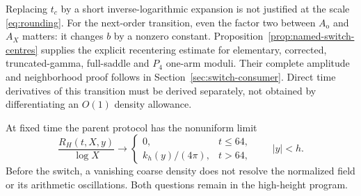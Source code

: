 \documentclass[11pt]{article}
\numberwithin{equation}{section}
\begin{document}
Replacing \(t_c\) by a short inverse-logarithmic expansion is not justified
at the scale \eqref{eq:rounding}. For the next-order transition, even
the factor two between \(A_{\mathrm o}\) and \(A_X\) matters:
it changes \(b\) by a nonzero constant. Proposition~\ref{prop:named-switch-centres} supplies the explicit
recentering estimate for elementary, corrected, truncated-gamma,
full-saddle and $P_4$ one-arm moduli. Their complete amplitude and
neighborhood proof follows in Section~\ref{sec:switch-consumer}.
Direct time derivatives of this transition must be derived separately,
not obtained by differentiating an \(O(1)\) density allowance.

At fixed time the parent protocol has the nonuniform limit
\[
\frac{R_H(t,X,y)}{\log X}\longrightarrow
\begin{cases}0,&t\le64,\\ k_h(y)/(4\pi),&t>64,\end{cases}
\qquad |y|<h.
\]
Before the switch, a vanishing coarse density does not resolve the
normalized field or its arithmetic oscillations. Both questions remain
in the high-height program.



\clearpage
\end{document}
